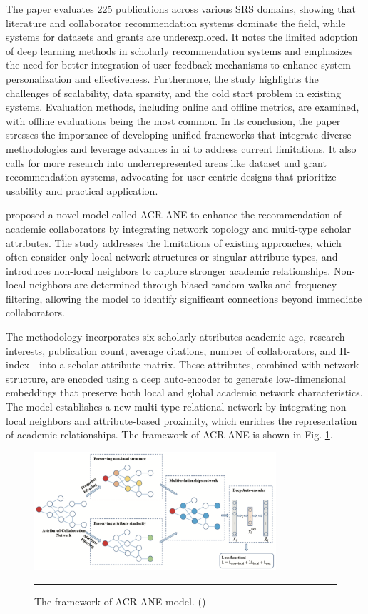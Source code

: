 The paper evaluates 225 publications across various SRS domains, showing that literature and collaborator recommendation systems dominate the field, while systems for datasets and grants are underexplored.
It notes the limited adoption of deep learning methods in scholarly recommendation systems and emphasizes the need for better integration of user feedback mechanisms to enhance system personalization and effectiveness.
Furthermore, the study highlights the challenges of scalability, data sparsity, and the cold start problem in existing systems.
Evaluation methods, including online and offline metrics, are examined, with offline evaluations being the most common.
In its conclusion, the paper stresses the importance of developing unified frameworks that integrate diverse methodologies and leverage advances in \gls{ai} to address current limitations.
It also calls for more research into underrepresented areas like dataset and grant recommendation systems, advocating for user-centric designs that prioritize usability and practical application.

\cite{Du2022} proposed a novel model called ACR-ANE to enhance the recommendation of academic collaborators by integrating network topology and multi-type scholar attributes.
The study addresses the limitations of existing approaches, which often consider only local network structures or singular attribute types, and introduces non-local neighbors to capture stronger academic relationships.
Non-local neighbors are determined through biased random walks and frequency filtering, allowing the model to identify significant connections beyond immediate collaborators.

The methodology incorporates six scholarly attributes-academic age, research interests, publication count, average citations, number of collaborators, and H-index—into a scholar attribute matrix.
These attributes, combined with network structure, are encoded using a deep auto-encoder to generate low-dimensional embeddings that preserve both local and global academic network characteristics.
The model establishes a new multi-type relational network by integrating non-local neighbors and attribute-based proximity, which enriches the representation of academic relationships.
The framework of ACR-ANE is shown in Fig. \ref{fig:acr-ane}.

\begin{figure}[htbp]
    \centering
 \includegraphics[width=0.8\textwidth]{03_Figures/literature-review/academic-collaborator-recommendation-framework.png}
     \rule{35em}{0.5pt}
    \caption{The framework of ACR-ANE model. (\cite{Du2022})}
 \label{fig:acr-ane}
\end{figure}

